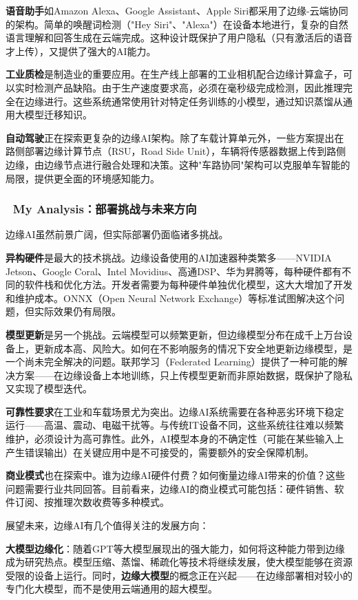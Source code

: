 \textbf{语音助手}如Amazon Alexa、Google Assistant、Apple Siri都采用了边缘-云端协同的架构。简单的唤醒词检测（"Hey Siri"、"Alexa"）在设备本地进行，复杂的自然语言理解和回答生成在云端完成。这种设计既保护了用户隐私（只有激活后的语音才上传），又提供了强大的AI能力。

\textbf{工业质检}是制造业的重要应用。在生产线上部署的工业相机配合边缘计算盒子，可以实时检测产品缺陷。由于生产速度要求高，必须在毫秒级完成检测，因此推理完全在边缘进行。这些系统通常使用针对特定任务训练的小模型，通过知识蒸馏从通用大模型迁移知识。

\textbf{自动驾驶}正在探索更复杂的边缘AI架构。除了车载计算单元外，一些方案提出在路侧部署边缘计算节点（RSU，Road Side Unit），车辆将传感器数据上传到路侧边缘，由边缘节点进行融合处理和决策。这种"车路协同"架构可以克服单车智能的局限，提供更全面的环境感知能力。

\subsubsection{🧠 My Analysis：部署挑战与未来方向}

边缘AI虽然前景广阔，但实际部署仍面临诸多挑战。

\textbf{异构硬件}是最大的技术挑战。边缘设备使用的AI加速器种类繁多——NVIDIA Jetson、Google Coral、Intel Movidius、高通DSP、华为昇腾等，每种硬件都有不同的软件栈和优化方法。开发者需要为每种硬件单独优化模型，这大大增加了开发和维护成本。ONNX（Open Neural Network Exchange）等标准试图解决这个问题，但实际效果仍有局限。

\textbf{模型更新}是另一个挑战。云端模型可以频繁更新，但边缘模型分布在成千上万台设备上，更新成本高、风险大。如何在不影响服务的情况下安全地更新边缘模型，是一个尚未完全解决的问题。联邦学习（Federated Learning）提供了一种可能的解决方案——在边缘设备上本地训练，只上传模型更新而非原始数据，既保护了隐私又实现了模型迭代。

\textbf{可靠性要求}在工业和车载场景尤为突出。边缘AI系统需要在各种恶劣环境下稳定运行——高温、震动、电磁干扰等。与传统IT设备不同，这些系统往往难以频繁维护，必须设计为高可靠性。此外，AI模型本身的不确定性（可能在某些输入上产生错误输出）在关键应用中是不可接受的，需要额外的安全保障机制。

\textbf{商业模式}也在探索中。谁为边缘AI硬件付费？如何衡量边缘AI带来的价值？这些问题需要行业共同回答。目前看来，边缘AI的商业模式可能包括：硬件销售、软件订阅、按推理次数收费等多种模式。

展望未来，边缘AI有几个值得关注的发展方向：

\textbf{大模型边缘化}：随着GPT等大模型展现出的强大能力，如何将这种能力带到边缘成为研究热点。模型压缩、蒸馏、稀疏化等技术将继续发展，使大模型能够在资源受限的设备上运行。同时，\textbf{边缘大模型}的概念正在兴起——在边缘部署相对较小的专门化大模型，而不是使用云端通用的超大模型。

